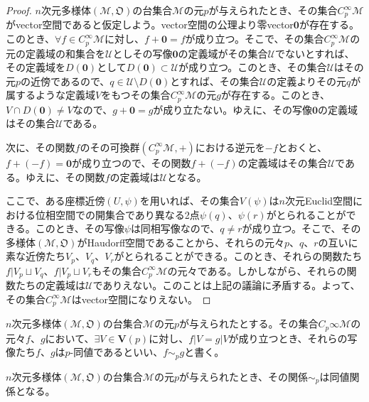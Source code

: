 \documentclass[dvipdfmx]{jsarticle}
\begin{document}
\begin{proof}
  $n$次元多様体$\left(\mathcal{M},\mathfrak{O}\right)$の台集合$\mathcal{M}$の元$p$が与えられたとき、その集合$C^\infty_p \mathcal{M} $がvector空間であると仮定しよう。vector空間の公理より零vector$\mathbf{0} $が存在する。このとき、$\forall f\in C^\infty_p \mathcal{M} $に対し、$f+\mathbf{0}=f$が成り立つ。そこで、その集合$C^\infty_p \mathcal{M} $の元の定義域の和集合を$\mathcal{U}$としその写像$\mathbf{0}$の定義域がその集合$\mathcal{U}$でないとすれば、その定義域を$D\left(\mathbf{0}\right)$として$D\left(\mathbf{0}\right)\subset \mathcal{U} $が成り立つ。このとき、その集合$\mathcal{U}$はその元$p$の近傍であるので、$q\in \mathcal{U} \setminus D\left(\mathbf{0}\right)$とすれば、その集合$\mathcal{U}$の定義よりその元$q$が属するような定義域$V$をもつその集合$C^\infty_p \mathcal{M} $の元$g$が存在する。このとき、$V\cap D\left(\mathbf{0}\right) \ne V$なので、$g+\mathbf{0}=g$が成り立たない。ゆえに、その写像$\mathbf{0}$の定義域はその集合$\mathcal{U}$である。\par
  次に、その関数$f$のその可換群$\left(C^\infty_p \mathcal{M},+\right) $における逆元を$-f$とおくと、$f+\left(-f\right)=\mathbf{0}$が成り立つので、その関数$f+\left(-f\right)$の定義域はその集合$\mathcal{U}$である。ゆえに、その関数$f$の定義域は$\mathcal{U}$となる。\par
  ここで、ある座標近傍$\left(U ,\psi \right)$を用いれば、その集合$V\left(\psi\right) $は$n$次元Euclid空間における位相空間での開集合であり異なる2点$\psi \left(q\right)$、$\psi\left(r\right)$がとられることができる。このとき、その写像$\psi $は同相写像なので、$q\ne r$が成り立つ。そこで、その多様体$\left(\mathcal{M},\mathfrak{O}\right)$がHaudorff空間であることから、それらの元々$p$、$q$、$r$の互いに素な近傍たち$V_p $、$V_q $、$V_r $がとられることができる。このとき、それらの関数たち$f|V_p \sqcup V_q$、$f|V_p \sqcup V_r$もその集合$C^\infty_p \mathcal{M}$の元々である。しかしながら、それらの関数たちの定義域は$\mathcal{U}$でありえない。このことは上記の議論に矛盾する。よって、その集合$C^\infty_p \mathcal{M} $はvector空間になりえない。
\end{proof}
\begin{dfn}
  $n$次元多様体$\left(\mathcal{M},\mathfrak{O}\right)$の台集合$\mathcal{M}$の元$p$が与えられたとする。その集合$C_p\infty \mathcal{M}$の元々$f$、$g$において、$\exists V\in \mathbf{V}\left(p\right)$に対し、$f|V=g|V$が成り立つとき、それらの写像たち$f$、$g$は$p$-同値であるといい、$f\sim_p g$と書く。
\end{dfn}
\begin{thm}\label{8.3.3.3}
  $n$次元多様体$\left(\mathcal{M},\mathfrak{O}\right)$の台集合$\mathcal{M}$の元$p$が与えられたとき、その関係$\sim_p $は同値関係となる。
\end{thm}
\end{document}
